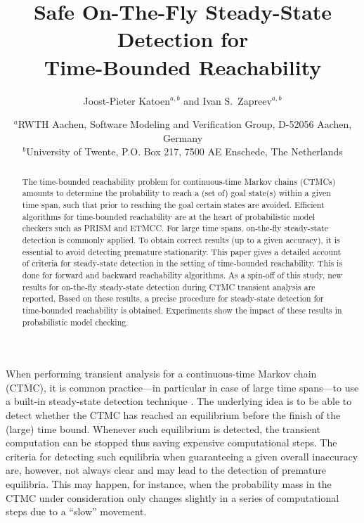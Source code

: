 \documentclass[times, 10pt,twocolumn]{article}
\begin{document}
\title{Safe On-The-Fly Steady-State Detection for \\ Time-Bounded Reachability}

\author{
   Joost-Pieter Katoen{$^{a,b}$}
   and Ivan S.\ Zapreev{$^{a,b}$}
   \and
   {$^{a}$}\small{RWTH Aachen, Software Modeling and Verification Group, D-52056 Aachen, 
           Germany}\\
   {$^{b}$}\small{University of Twente, P.O. Box 217, 7500 AE Enschede, 
           The Netherlands}
}

\date{}



\maketitle
\thispagestyle{empty}

\begin{abstract}
The time-bounded reachability problem for continuous-time Markov chains (CTMCs) amounts 
to determine the probability to reach a (set of) goal state(s) within a given time span, such that 
prior to reaching the goal certain states are avoided. 
Efficient algorithms for time-bounded reachability are at the heart of probabilistic model checkers
such as PRISM and ETMCC.
For large time spans, on-the-fly steady-state detection is commonly applied. 
To obtain correct results (up to a given accuracy), it is essential to avoid detecting premature stationarity. 
This paper gives a detailed account of criteria for  steady-state detection in the setting of time-bounded reachability. 
This is done for forward and backward reachability algorithms.  
As a spin-off of this study, new results for on-the-fly steady-state detection during CTMC 
transient analysis are reported.  
Based on these results, a precise procedure for steady-state detection for time-bounded 
reachability is obtained.  
Experiments show the impact of these results in probabilistic model checking.
\end{abstract}

{}

When performing transient analysis for a continuous-time Markov chain (CTMC), it is common practice---in particular in case of large time spans---to use a built-in steady-state detection technique \cite{MalhotraMT_MR94,YounesKNP_STTT05}. 
The underlying idea is to be able to detect whether the CTMC has reached an equilibrium before the finish of the (large) time bound. Whenever such equilibrium is detected, the transient computation can be stopped thus saving expensive computational steps. 
The criteria for detecting such equilibria when guaranteeing a given overall inaccuracy are, however, not always clear and may lead to the detection of premature equilibria. 
This may happen, for instance, when the probability mass in the CTMC under consideration only changes slightly in a series of computational steps due to a ``slow'' movement.
\end{document}
